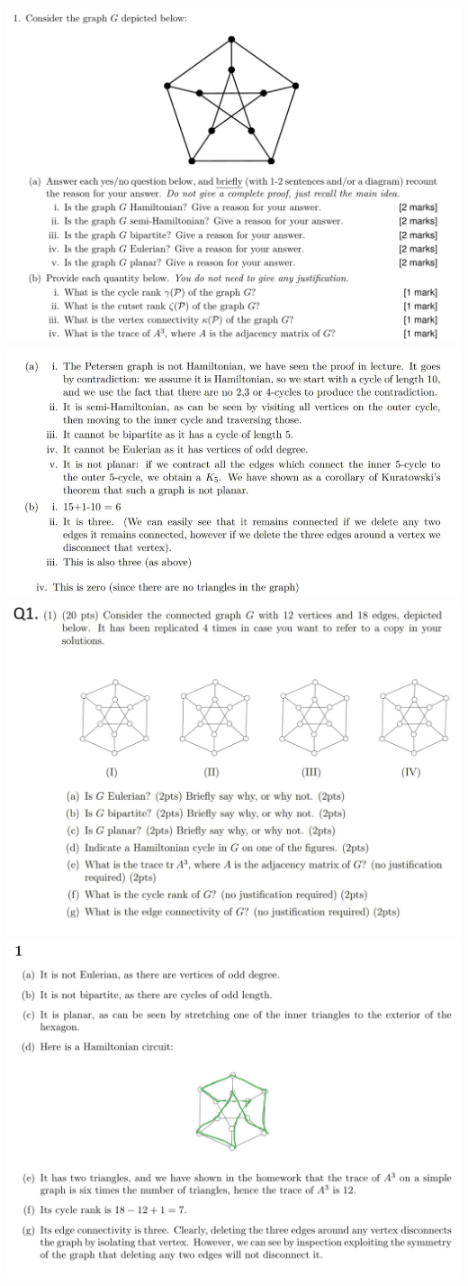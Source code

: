 \documentclass[10pt,landscape]{article}
\begin{document}
\begin{multicols}{2}
\includegraphics[width = 10 cm]{2022Q1.png}
\includegraphics[width = 10 cm]{2022A1.png}
\includegraphics[width = 10 cm]{MockQ1.png}
\includegraphics[width = 10 cm]{MockA1.png}

\end{multicols}
\end{document}
